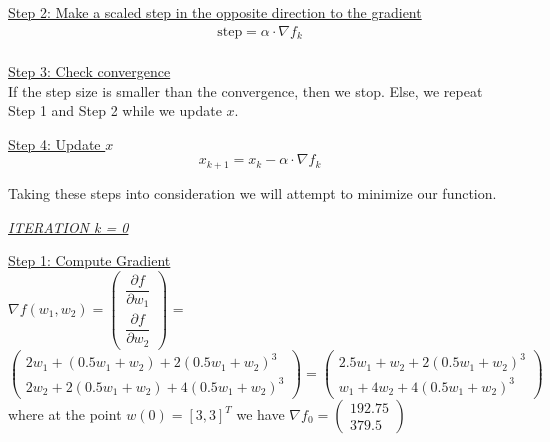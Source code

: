 \underline{Step 2: Make a scaled step in the opposite direction to the gradient}\\
\begin{equation}
	\begin{gathered}
		\text{step} = \alpha \cdot \nabla f_{k}\\
	\end{gathered}
\end{equation}
\vspace{2mm}

\underline{Step 3: Check convergence}\\
If the step size is smaller than the convergence, then we stop. Else, we repeat Step 1 and Step 2 while we update $x$.
\vspace{4mm}

\underline{Step 4: Update $x$}
\begin{equation}
	x_{k+1} = x_{k} - \alpha \cdot \nabla f_{k}
\end{equation}
\vspace{4mm}

Taking these steps into consideration we will attempt to minimize our function.\\

\begin{center}
	\underline{\textit{ITERATION k = 0}}
\end{center}

\underline{Step 1: Compute Gradient}\\
\(\nabla f(w_1,w_2) = \left(\begin{array}{c}
	\dfrac{\partial f}{\partial w_1} \\[4mm]
	\dfrac{\partial f}{\partial w_2}
\end{array}\right)\) = $\left(\begin{array}{c}
	2w_1 + (0.5w_1+w_2) + 2(0.5w_1+w_2)^3\\[1mm]
	2w_2 + 2(0.5w_1+w_2) + 4(0.5w_1+w_2)^3
\end{array}\right) = \left(\begin{array}{c}
	2.5w_1 + w_2 + 2(0.5w_1+w_2)^3\\[1mm]
	w_1 + 4w_2 + 4(0.5w_1+w_2)^3
\end{array}\right)$ \\[3mm]

where at the point $w\left(0\right) = \left[3, 3\right]^T$ we have $\nabla f_{0} = \left(\begin{array}{c}
	192.75 \\
	379.5
\end{array}\right)$
\\[4mm]

